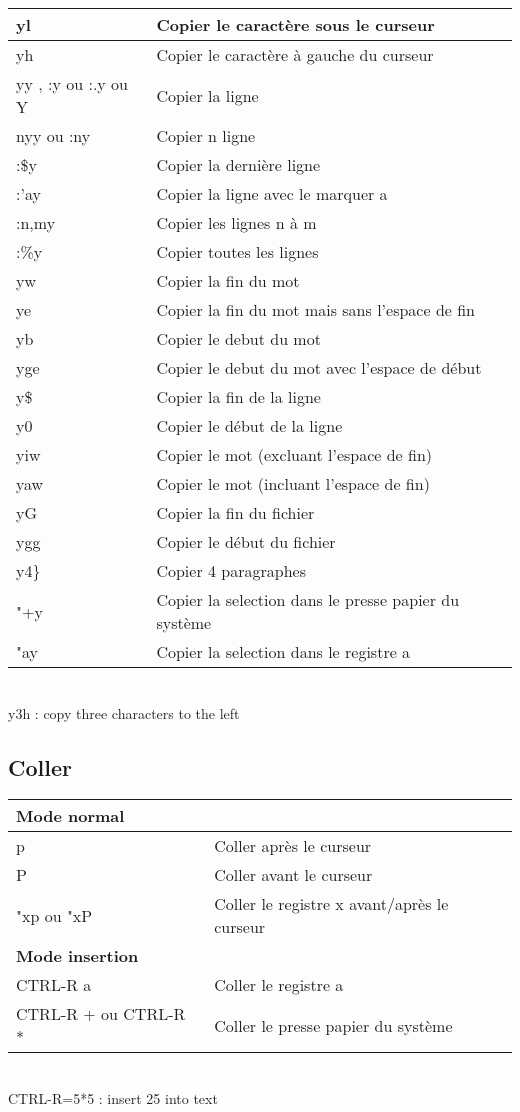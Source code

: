 \documentclass{article}
\begin{document}
\begin{tabular}{|p{3cm}| l| }\hline
yl & Copier le caractère sous le curseur \\ \hline
yh & Copier le caractère à gauche du curseur \\ \hline
yy , :y ou :.y ou Y & Copier la ligne \\ \hline
nyy ou :ny & Copier n ligne \\ \hline
:\$y & Copier la dernière ligne \\ \hline
:'ay & Copier la ligne avec le marquer a \\ \hline
:n,my & Copier les lignes n à m \\ \hline
:\%y & Copier toutes les lignes \\ \hline
yw & Copier la fin du mot \\ \hline
ye & Copier la fin du mot mais sans l'espace de fin\\ \hline
yb & Copier le debut du mot\\ \hline
yge & Copier le debut du mot avec l'espace de début\\ \hline
y\$ & Copier la fin de la ligne \\ \hline
y0 & Copier le début de la ligne \\ \hline
yiw & Copier le mot (excluant l'espace de fin)\\ \hline
yaw & Copier le mot (incluant l'espace de fin)\\ \hline
yG & Copier la fin du fichier\\ \hline
ygg & Copier le début du fichier\\ \hline
y4\} & Copier 4 paragraphes\\ \hline
"+y & Copier la selection dans le presse papier du système\\ \hline
"ay & Copier la selection dans le registre a\\ \hline
\end{tabular}\\
y3h : copy three characters to the left


\subsection{Coller}
\begin{tabular}{|p{4cm}| l| }\hline
\multicolumn{2}{|l|}{\textbf{Mode normal }} \\ \hline
p & Coller après le curseur \\ \hline
P & Coller avant le curseur \\ \hline
"xp ou "xP &  Coller le registre x avant/après le curseur \\ \hline
\multicolumn{2}{|l|}{\textbf{Mode insertion}} \\ \hline
CTRL-R a & Coller le registre a \\ \hline
CTRL-R + ou CTRL-R * & Coller le presse papier du système\\ \hline
\end{tabular}\\
CTRL-R=5*5    : insert 25 into text
\end{document}
